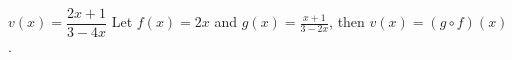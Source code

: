 {$v(x) = \dfrac{2x+1}{3-4x}$}
{Let $f(x) =2x$ and $g(x) = \frac{x+1}{3-2x}$, then  $v(x) =(g\circ f)(x)$.}